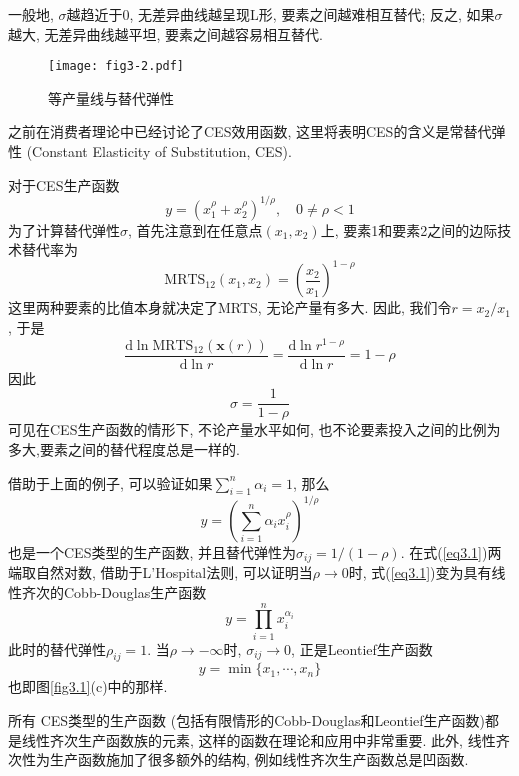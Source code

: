 \documentclass[cn, 12pt, math=mtpro2, bibstyle=apa, blue]{elegantbook}
\newcommand{\x}{\mathbf{x}}
\begin{document}
一般地, $\sigma$越趋近于0, 无差异曲线越呈现L形, 要素之间越难相互替代; 反之, 如果$\sigma$越大, 无差异曲线越平坦, 要素之间越容易相互替代.

\begin{figure}[htbp!]
  \centering
  \texttt{[image: fig3-2.pdf]}
  \caption{等产量线与替代弹性}\label{fig3.2}
\end{figure}

\begin{example}[$\,$CES生产函数]
之前在消费者理论中已经讨论了CES效用函数, 这里将表明CES的含义是常替代弹性 (Constant Elasticity of Substitution, CES).

对于CES生产函数
$$y=(x_1^\rho+x_2^\rho)^{1/\rho},\quad 0\neq \rho<1$$
为了计算替代弹性$\sigma$, 首先注意到在任意点$(x_1,x_2)$上, 要素1和要素2之间的边际技术替代率为
$$\text{MRTS}_{12}(x_1,x_2)=\left(\frac{x_2}{x_1}\right)^{1-\rho}$$
这里两种要素的比值本身就决定了MRTS, 无论产量有多大. 因此, 我们令$r=x_2/x_1$, 于是
$$\frac{\text{d}\ln\text{MRTS}_{12}(\x(r))}{\text{d}\ln r}=\frac{\text{d}\ln r^{1-\rho}}{\text{d}\ln r}=1-\rho$$
因此
$$\sigma=\frac{1}{1-\rho}$$
可见在CES生产函数的情形下, 不论产量水平如何, 也不论要素投入之间的比例为多大,要素之间的替代程度总是一样的.
\end{example}

借助于上面的例子, 可以验证如果$\sum_{i=1}^{n}\alpha_i=1$, 那么
\begin{equation}\label{eq3.1}
  y=\left(\sum_{i=1}^{n}\alpha_ix_i^\rho\right)^{1/\rho}
\end{equation}
也是一个CES类型的生产函数, 并且替代弹性为$\sigma_{ij}=1/(1-\rho)$. 在式(\ref{eq3.1})两端取自然对数, 借助于L'Hospital法则, 可以证明当$\rho\to0$时, 式(\ref{eq3.1})变为具有线性齐次的Cobb-Douglas生产函数
$$y=\prod_{i=1}^{n}x_i^{\alpha_i}$$
此时的替代弹性$\rho_{ij}=1$. 当$\rho\to-\infty$时, $\sigma_{ij}\to 0$, 正是Leontief生产函数
$$y=\min\{x_1,\cdots,x_n\}$$
也即图\ref{fig3.1}(c)中的那样.

所有 CES类型的生产函数 (包括有限情形的Cobb-Douglas和Leontief生产函数)都是线性齐次生产函数族的元素, 这样的函数在理论和应用中非常重要. 此外, 线性齐次性为生产函数施加了很多额外的结构, 例如线性齐次生产函数总是凹函数.
\end{document}
